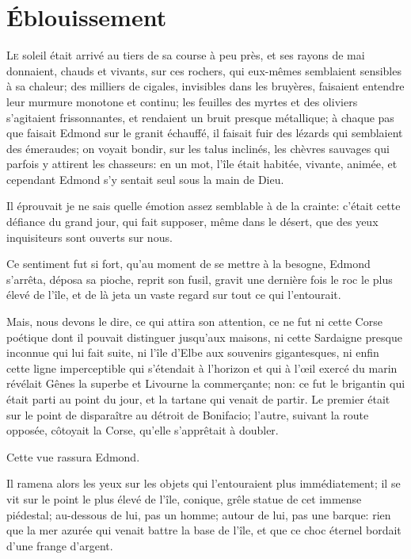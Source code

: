 \chapter{Éblouissement}

\lettrine{L}{e} soleil était arrivé au tiers de sa course à peu près, et ses rayons de mai donnaient, chauds et vivants, sur ces rochers, qui eux-mêmes semblaient sensibles à sa chaleur; des milliers de cigales, invisibles dans les bruyères, faisaient entendre leur murmure monotone et continu; les feuilles des myrtes et des oliviers s'agitaient frissonnantes, et rendaient un bruit presque métallique; à chaque pas que faisait Edmond sur le granit échauffé, il faisait fuir des lézards qui semblaient des émeraudes; on voyait bondir, sur les talus inclinés, les chèvres sauvages qui parfois y attirent les chasseurs: en un mot, l'île était habitée, vivante, animée, et cependant Edmond s'y sentait seul sous la main de Dieu.

Il éprouvait je ne sais quelle émotion assez semblable à de la crainte: c'était cette défiance du grand jour, qui fait supposer, même dans le désert, que des yeux inquisiteurs sont ouverts sur nous.

Ce sentiment fut si fort, qu'au moment de se mettre à la besogne, Edmond s'arrêta, déposa sa pioche, reprit son fusil, gravit une dernière fois le roc le plus élevé de l'île, et de là jeta un vaste regard sur tout ce qui l'entourait.

Mais, nous devons le dire, ce qui attira son attention, ce ne fut ni cette Corse poétique dont il pouvait distinguer jusqu'aux maisons, ni cette Sardaigne presque inconnue qui lui fait suite, ni l'île d'Elbe aux souvenirs gigantesques, ni enfin cette ligne imperceptible qui s'étendait à l'horizon et qui à l'œil exercé du marin révélait Gênes la superbe et Livourne la commerçante; non: ce fut le brigantin qui était parti au point du jour, et la tartane qui venait de partir. Le premier était sur le point de disparaître au détroit de Bonifacio; l'autre, suivant la route opposée, côtoyait la Corse, qu'elle s'apprêtait à doubler.

Cette vue rassura Edmond.

Il ramena alors les yeux sur les objets qui l'entouraient plus immédiatement; il se vit sur le point le plus élevé de l'île, conique, grêle statue de cet immense piédestal; au-dessous de lui, pas un homme; autour de lui, pas une barque: rien que la mer azurée qui venait battre la base de l'île, et que ce choc éternel bordait d'une frange d'argent.

